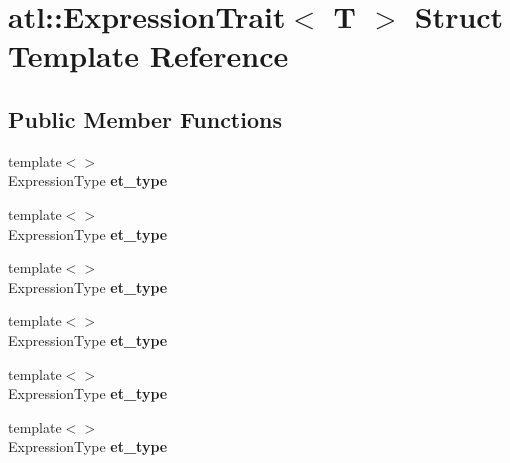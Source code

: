 \hypertarget{structatl_1_1_expression_trait}{\section{atl\+:\+:Expression\+Trait$<$ T $>$ Struct Template Reference}
\label{structatl_1_1_expression_trait}
}
\subsection*{Public Member Functions}
\begin{DoxyCompactItemize}
\item 
\hypertarget{structatl_1_1_expression_trait_ab387a6b859a0f734b5b35ff90ca12f06}{{\footnotesize template$<$$>$ }\\Expression\+Type {\bfseries et\+\_\+type}}\label{structatl_1_1_expression_trait_ab387a6b859a0f734b5b35ff90ca12f06}

\item 
\hypertarget{structatl_1_1_expression_trait_a623a8baffc6a22b5f13e4a3c73e2df22}{{\footnotesize template$<$$>$ }\\Expression\+Type {\bfseries et\+\_\+type}}\label{structatl_1_1_expression_trait_a623a8baffc6a22b5f13e4a3c73e2df22}

\item 
\hypertarget{structatl_1_1_expression_trait_ac22f1cf782c1d22a113910e2f0b149de}{{\footnotesize template$<$$>$ }\\Expression\+Type {\bfseries et\+\_\+type}}\label{structatl_1_1_expression_trait_ac22f1cf782c1d22a113910e2f0b149de}

\item 
\hypertarget{structatl_1_1_expression_trait_ab387a6b859a0f734b5b35ff90ca12f06}{{\footnotesize template$<$$>$ }\\Expression\+Type {\bfseries et\+\_\+type}}\label{structatl_1_1_expression_trait_ab387a6b859a0f734b5b35ff90ca12f06}

\item 
\hypertarget{structatl_1_1_expression_trait_a623a8baffc6a22b5f13e4a3c73e2df22}{{\footnotesize template$<$$>$ }\\Expression\+Type {\bfseries et\+\_\+type}}\label{structatl_1_1_expression_trait_a623a8baffc6a22b5f13e4a3c73e2df22}

\item 
\hypertarget{structatl_1_1_expression_trait_ac22f1cf782c1d22a113910e2f0b149de}{{\footnotesize template$<$$>$ }\\Expression\+Type {\bfseries et\+\_\+type}}\label{structatl_1_1_expression_trait_ac22f1cf782c1d22a113910e2f0b149de}

\end{DoxyCompactItemize}
